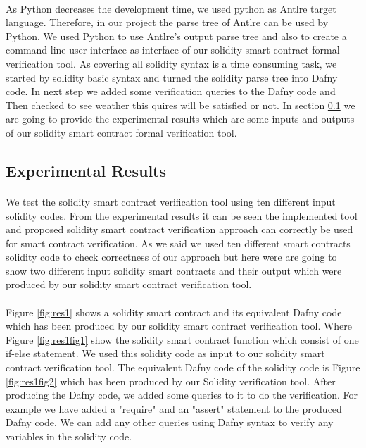\documentclass[11pt]{article}
\begin{document}
\paragraph{}
As Python decreases the development time, we used python as Antlre target language. Therefore, in our project the parse tree of Antlre can be used by Python. We used Python to use Antlre's output parse tree and also to create a command-line user interface as interface of our solidity smart contract formal verification tool. As covering all solidity syntax is a time consuming task, we started by solidity basic syntax and turned the solidity parse tree into Dafny code. In next step we added some verification queries to the Dafny code and Then checked to see weather this quires will be satisfied or not. In section \ref{ER} we are going to provide the experimental results which are some inputs and outputs of our solidity smart contract formal verification tool.

\subsection{Experimental Results}\label{ER}
\paragraph{}
We test the solidity smart contract verification tool using ten different input solidity codes. From the experimental results it can be seen the implemented tool and proposed solidity smart contract verification approach can correctly be used for smart contract verification. As we said we used ten different smart contracts solidity code to check correctness of our approach but here were are going to show two different input solidity smart contracts and their output which were produced by our solidity smart contract verification tool. 

\paragraph{}
Figure \ref{fig:res1} shows a solidity smart contract and its equivalent Dafny code which has been produced by our solidity smart contract verification tool. Where Figure \ref{fig:res1fig1} show the solidity smart contract function which consist of one if-else statement. We used this solidity code as input to our solidity smart contract verification tool. The equivalent Dafny code of the solidity code is Figure \ref{fig:res1fig2} which has been produced by our Solidity verification tool. After producing the Dafny code, we added some queries to it to do the verification. For example we have added a "require" and an "assert" statement to the produced Dafny code. We can add any other queries using Dafny syntax to verify any variables in the solidity code. 
\end{document}
